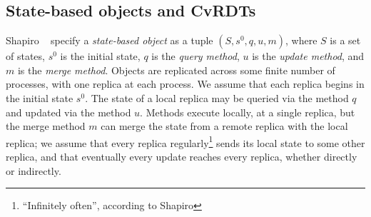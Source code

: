\documentclass{article}
\begin{document}
\subsection{State-based objects and CvRDTs}

Shapiro \etal~\cite{crdts, crdts-tr} specify a \emph{state-based
  object} as a tuple $(S, s^0, q, u, m)$, where $S$ is a set of
states, $s^0$ is the initial state, $q$ is the \emph{query method},
$u$ is the \emph{update method}, and $m$ is the \emph{merge method}.
Objects are replicated across some finite number of processes, with
one replica at each process.  We assume that each replica begins in
the initial state $s^0$.  The state of a local replica may be queried
via the method $q$ and updated via the method $u$.  Methods execute
locally, at a single replica, but the merge method $m$ can merge the
state from a remote replica with the local replica; we assume that
every replica regularly\footnote{``Infinitely often'', according to
  Shapiro \etal} sends its local state to some other replica, and that
eventually every update reaches every replica, whether directly or
indirectly.
\end{document}

